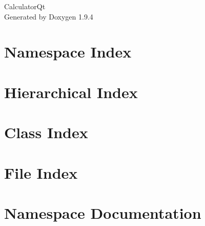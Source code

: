 \documentclass[twoside]{book}
\newcommand{\+}{\discretionary{\mbox{\scriptsize$\hookleftarrow$}}{}{}}
\newcommand{\clearemptydoublepage}{%
    \newpage{\pagestyle{empty}\cleardoublepage}%
  }
\begin{document}
  \raggedbottom
    \hypersetup{pageanchor=false,
                bookmarksnumbered=true,
                pdfencoding=unicode
               }
  \begin{titlepage}
  \vspace*{7cm}
  \begin{center}%
  {\Large Calculator\+Qt}\\
  \vspace*{1cm}
  {\large Generated by Doxygen 1.9.4}\\
  \end{center}
  \end{titlepage}
  \clearemptydoublepage
  \tableofcontents
  \clearemptydoublepage
  \hypersetup{pageanchor=true}
\chapter{Namespace Index}

\chapter{Hierarchical Index}

\chapter{Class Index}

\chapter{File Index}

\chapter{Namespace Documentation}


\end{document}
